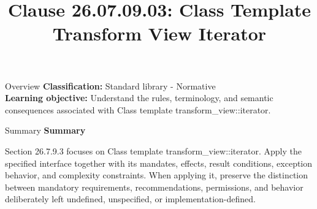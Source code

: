 \documentclass[10pt,letterpaper]{article}
\title{Clause 26.07.09.03: Class Template Transform View Iterator}
\author{}
\date{}
\begin{document}
\maketitle
\begin{CornellOverviewBox}{Overview}
\textbf{Classification:} Standard library - Normative\\[2pt]
\textbf{Learning objective:} Understand the rules, terminology, and semantic consequences associated with Class template transform\_view::iterator.
\end{CornellOverviewBox}\begin{CornellSummaryBox}{Summary}
{\sffamily\bfseries\color{Accent} Summary}\par\vspace{3pt}Section 26.7.9.3 focuses on Class template transform\_view::iterator. Apply the specified interface together with its mandates, effects, result conditions, exception behavior, and complexity constraints. When applying it, preserve the distinction between mandatory requirements, recommendations, permissions, and behavior deliberately left undefined, unspecified, or implementation-defined.
\end{CornellSummaryBox}
\end{document}
